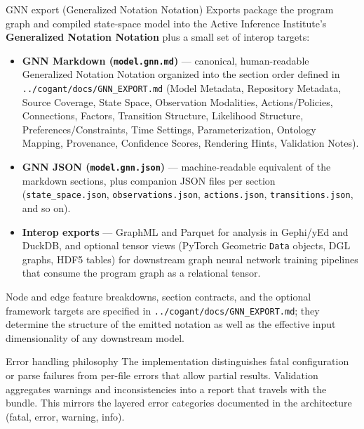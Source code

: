 \documentclass[
  ignorenonframetext,
]{beamer}
\providecommand{\tightlist}{%
  \setlength{\itemsep}{0pt}\setlength{\parskip}{0pt}}
\begin{document}
\begin{frame}[fragile]{GNN export (Generalized Notation Notation)}
\protect{}\label{gnn-export-generalized-notation-notation}
Exports package the program graph and compiled state-space model into
the Active Inference Institute's \textbf{Generalized Notation Notation}
plus a small set of interop targets:

\begin{itemize}
\tightlist
\item
  \textbf{GNN Markdown (\texttt{model.gnn.md})} --- canonical,
  human-readable Generalized Notation Notation organized into the
  section order defined in \texttt{../cogant/docs/GNN\_EXPORT.md} (Model
  Metadata, Repository Metadata, Source Coverage, State Space,
  Observation Modalities, Actions/Policies, Connections, Factors,
  Transition Structure, Likelihood Structure, Preferences/Constraints,
  Time Settings, Parameterization, Ontology Mapping, Provenance,
  Confidence Scores, Rendering Hints, Validation Notes).
\item
  \textbf{GNN JSON (\texttt{model.gnn.json})} --- machine-readable
  equivalent of the markdown sections, plus companion JSON files per
  section (\texttt{state\_space.json}, \texttt{observations.json},
  \texttt{actions.json}, \texttt{transitions.json}, and so on).
\item
  \textbf{Interop exports} --- GraphML and Parquet for analysis in
  Gephi/yEd and DuckDB, and optional tensor views (PyTorch Geometric
  \texttt{Data} objects, DGL graphs, HDF5 tables) for downstream graph
  neural network training pipelines that consume the program graph as a
  relational tensor.
\end{itemize}

Node and edge feature breakdowns, section contracts, and the optional
framework targets are specified in
\texttt{../cogant/docs/GNN\_EXPORT.md}; they determine the structure of
the emitted notation as well as the effective input dimensionality of
any downstream model.
\end{frame}

\begin{frame}{Error handling philosophy}
\protect{}\label{error-handling-philosophy}
The implementation distinguishes fatal configuration or parse failures
from per-file errors that allow partial results. Validation aggregates
warnings and inconsistencies into a report that travels with the bundle.
This mirrors the layered error categories documented in the architecture
(fatal, error, warning, info).
\end{frame}
\end{document}
